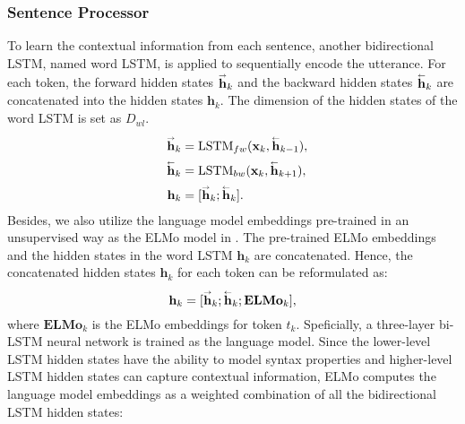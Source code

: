 \documentclass[11pt,a4paper]{article}
\begin{document}
\subsubsection{Sentence Processor}
To learn the contextual information from each sentence, another bidirectional LSTM, named word LSTM, is applied to sequentially encode the utterance. 
For each token, the forward hidden states ${\mathord{\buildrel{\lower3pt\hbox{$\scriptscriptstyle\rightarrow$}}\over {\mathbf{h}}} }_{k}$ and the backward hidden states ${\mathord{\buildrel{\lower3pt\hbox{$\scriptscriptstyle\leftarrow$}}\over {\mathbf{h}}} }_{k}$ are concatenated into the hidden states $\mathbf{h}_{k}$.
The dimension of the hidden states of the word LSTM is set as $D_{wl}$.
\begin{align}
\begin{split}
     {\mathord{\buildrel{\lower3pt\hbox{$\scriptscriptstyle\rightarrow$}}\over {\mathbf{h}}} }_{k}  &= {\rm LSTM}_{fw} (\mathbf{x}_{k}, {\mathord{\buildrel{\lower3pt\hbox{$\scriptscriptstyle\leftarrow$}}\over {\mathbf{h}}} }_{k-1} ), \\
     ~~{\mathord{\buildrel{\lower3pt\hbox{$\scriptscriptstyle\leftarrow$}}\over {\mathbf{h}}} }_{k} &= {\rm LSTM}_{bw} (\mathbf{x}_{k},  {\mathord{\buildrel{\lower3pt\hbox{$\scriptscriptstyle\leftarrow$}}\over {\mathbf{h}}} }_{k+1}), \\
     ~~\mathbf{h}_{k} &= [ {\mathord{\buildrel{\lower3pt\hbox{$\scriptscriptstyle\rightarrow$}}\over {\mathbf{h}}} }_{k}; {\mathord{\buildrel{\lower3pt\hbox{$\scriptscriptstyle\leftarrow$}}\over {\mathbf{h}}} }_{k}]. 
\end{split}
\end{align}
Besides, we also utilize the language model embeddings pre-trained in an unsupervised way as the ELMo model in \citep{peters2018deep}. The pre-trained ELMo embeddings and the hidden states in the word LSTM $\mathbf{h}_{k}$ are concatenated.
Hence, the concatenated hidden states $\mathbf{h}_{k}$ for each token can be reformulated as:
\begin{equation}
    \mathbf{h}_{k} = [ {\mathord{\buildrel{\lower3pt\hbox{$\scriptscriptstyle\rightarrow$}}\over {\mathbf{h}}} }_{k}; {\mathord{\buildrel{\lower3pt\hbox{$\scriptscriptstyle\leftarrow$}}\over {\mathbf{h}}} }_{k}; \mathbf{ELMo}_{k}],
\end{equation}
where $\mathbf{ELMo}_{k}$ is the ELMo embeddings for token $t_k$. Speficially, a three-layer bi-LSTM neural network is trained as the language model. Since the lower-level LSTM hidden states have the ability to model syntax properties and higher-level LSTM hidden states can capture contextual information, ELMo computes the language model embeddings as a weighted combination of all the bidirectional LSTM hidden states:
\end{document}
